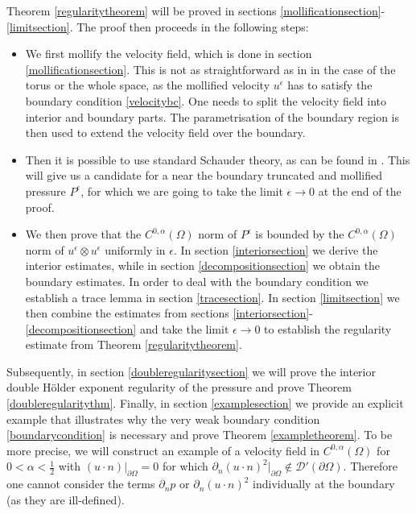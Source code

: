 \documentclass[12pt,a4paper]{article}
\theoremstyle{definition}
\theoremstyle{remark}
\numberwithin{equation}{section}
\begin{document}
Theorem \ref{regularitytheorem} will be proved in sections \ref{mollificationsection}-\ref{limitsection}. The proof then proceeds in the following steps:
\begin{itemize}
    \item We first mollify the velocity field, which is done in section \ref{mollificationsection}. This is not as straightforward as in in the case of the torus or the whole space, as the mollified velocity $u^\epsilon$ has to satisfy the boundary condition \eqref{velocitybc}. One needs to split the velocity field into interior and boundary parts. The parametrisation of the boundary region is then used to extend the velocity field over the boundary. 
    \item Then it is possible to use standard Schauder theory, as can be found in \cite{krylov,ladyzhenskaya,gilbarg,hanbook,giaquinta}. This will give us a candidate for a near the boundary truncated and mollified pressure $P^\epsilon$, for which we are going to take the limit $\epsilon \rightarrow 0$ at the end of the proof. 
    \item We then prove that the $C^{0,\alpha} (\Omega)$ norm of $P^\epsilon$ is bounded by the $C^{0,\alpha} (\Omega)$ norm of $u^\epsilon \otimes u^\epsilon$ uniformly in $\epsilon$. In section \ref{interiorsection} we derive the interior estimates, while in section \ref{decompositionsection} we obtain the boundary estimates. In order to deal with the boundary condition we establish a trace lemma in section \ref{tracesection}. In section \ref{limitsection} we then combine the estimates from sections \ref{interiorsection}-\ref{decompositionsection} and take the limit $\epsilon \rightarrow 0$ to establish the regularity estimate from Theorem \ref{regularitytheorem}.
\end{itemize}
Subsequently, in section \ref{doubleregularitysection} we will prove the interior double Hölder exponent regularity of the pressure and prove Theorem \ref{doubleregularitythm}. Finally, in section \ref{examplesection} we provide an explicit example that illustrates why the very weak boundary condition \eqref{boundarycondition} is necessary and prove Theorem \ref{exampletheorem}. To be more precise, we will construct an example of a velocity field in $C^{0,\alpha} (\Omega)$ for $0< \alpha < \frac{1}{2}$ with $(u \cdot n)\lvert_{\partial \Omega} = 0$ for which $\partial_n (u \cdot n)^2 \lvert_{\partial \Omega} \notin \mathcal{D}' (\partial \Omega)$. Therefore one cannot consider the terms $\partial_n p$ or $\partial_n (u \cdot n)^2$ individually at the boundary (as they are ill-defined). 
\end{document}
